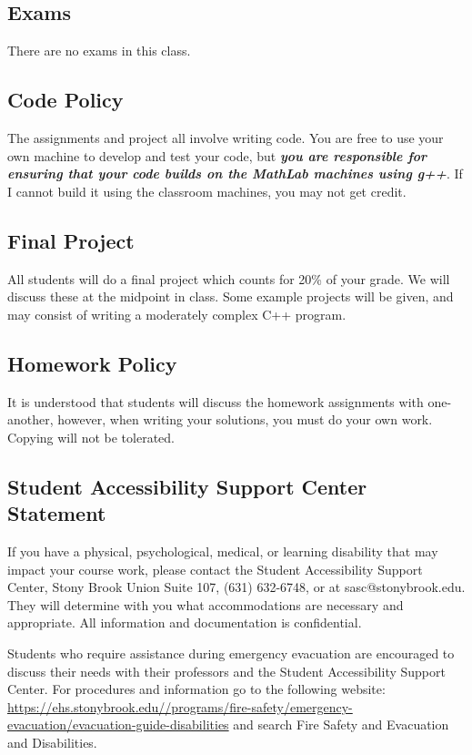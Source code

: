 \documentclass[10pt]{article}
\begin{document}
\subsection*{Exams}

\noindent There are no exams in this class.

\subsection*{Code Policy}

The assignments and project all involve writing code.  You are
free to use your own machine to develop and test your code, but
{\em \bfseries you are responsible for ensuring that your code builds on the
MathLab machines using g++}.  If I cannot build it using the classroom
machines, you may not get credit.

\subsection*{Final Project}

\noindent All students will do a final project which counts for 20\%
of your grade.  We will discuss these at the midpoint in class.  Some
example projects will be given, and may consist of writing a moderately
complex C++ program.

\subsection*{Homework Policy}

\noindent It is understood that students will discuss the homework
assignments with one-another, however, when writing your solutions,
you must do your own work.  Copying will not be tolerated.



\subsection*{Student Accessibility Support Center Statement}

If you have a physical, psychological, medical, or learning disability
that may impact your course work, please contact the Student
Accessibility Support Center, Stony Brook Union Suite 107, (631)
632-6748, or at sasc@stonybrook.edu. They will determine with you what
accommodations are necessary and appropriate. All information and
documentation is confidential.

Students who require assistance during emergency evacuation are
encouraged to discuss their needs with their professors and the
Student Accessibility Support Center. For procedures and information
go to the following website:
{\small \url{https://ehs.stonybrook.edu//programs/fire-safety/emergency-evacuation/evacuation-guide-disabilities}}
and search Fire Safety and Evacuation and Disabilities.
\end{document}
